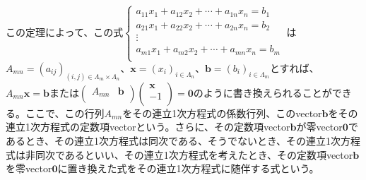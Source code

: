 \documentclass[dvipdfmx]{jsarticle}
\begin{document}
\begin{dfn}
この定理によって、この式$\left\{ \begin{matrix}
a_{11}x_{1} + a_{12}x_{2} + \cdots + a_{1n}x_{n} = b_{1} \\
a_{21}x_{1} + a_{22}x_{2} + \cdots + a_{2n}x_{n} = b_{2} \\
 \vdots \\
a_{m1}x_{1} + a_{m2}x_{2} + \cdots + a_{mn}x_{n} = b_{m} \\
\end{matrix} \right.\ $は$A_{mn} = \left( a_{ij} \right)_{(i,j) \in \varLambda_{m} \times \varLambda_{n}}$、$\mathbf{x} = \left( x_{i} \right)_{i \in \varLambda_{n}}$、$\mathbf{b} = \left( b_{i} \right)_{i \in \varLambda_{m}}$とすれば、$A_{mn}\mathbf{x} = \mathbf{b}$または$\begin{pmatrix}
A_{mn} & \mathbf{b} \\
\end{pmatrix}\begin{pmatrix}
\mathbf{x} \\
 - 1 \\
\end{pmatrix} = \mathbf{0}$のように書き換えられることができる。ここで、この行列$A_{mn}$をその連立1次方程式の係数行列、このvector$\mathbf{b}$をその連立1次方程式の定数項vectorという。さらに、その定数項vector$\mathbf{b}$が零vector$\mathbf{0}$であるとき、その連立1次方程式は同次である、そうでないとき、その連立1次方程式は非同次であるといい、その連立1次方程式を考えたとき、その定数項vector$\mathbf{b}$を零vector$\mathbf{0}$に置き換えた式をその連立1次方程式に随伴する式という。
\end{dfn}
\end{document}
